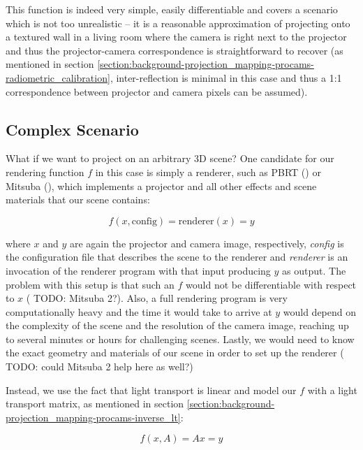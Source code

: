 This function is indeed very simple, easily differentiable and covers a scenario which is not too unrealistic -- it is a reasonable approximation of projecting onto a textured wall in a living room where the camera is right next to the projector and thus the projector-camera correspondence is straightforward to recover (as mentioned in section \ref{section:background-projection_mapping-procams-radiometric_calibration}, inter-reflection is minimal in this case and thus a 1:1 correspondence between projector and camera pixels can be assumed).

\subsection{Complex Scenario}
\label{section:methods-rendering_function-complex}

What if we want to project on an arbitrary 3D scene? One candidate for our rendering function \(f\) in this case is simply a renderer, such as PBRT (\citet{PBRT3e}) or Mitsuba (\citet{Mitsuba}), which implements a projector and all other effects and scene materials that our scene contains:

\begin{equation}
    \label{eq:rendering_function-renderer}
    f(x, \text{config}) = \text{renderer}(x) = y
\end{equation}

where \(x\) and \(y\) are again the projector and camera image, respectively, \textit{config} is the configuration file that describes the scene to the renderer and \textit{renderer} is an invocation of the renderer program with that input producing \(y\) as output. The problem with this setup is that such an \(f\) would not be differentiable with respect to \(x\) ({\color{red} TODO: Mitsuba 2?}). Also, a full rendering program is very computationally heavy and the time it would take to arrive at \(y\) would depend on the complexity of the scene and the resolution of the camera image, reaching up to several minutes or hours for challenging scenes. Lastly, we would need to know the exact geometry and materials of our scene in order to set up the renderer ({\color{red} TODO: could Mitsuba 2 help here as well?})

Instead, we use the fact that light transport is linear and model our \(f\) with a light transport matrix, as mentioned in section \ref{section:background-projection_mapping-procams-inverse_lt}:

\begin{equation}
    \label{eq:rendering_function-lt_matrix}
    f(x, A) = Ax = y
\end{equation}

